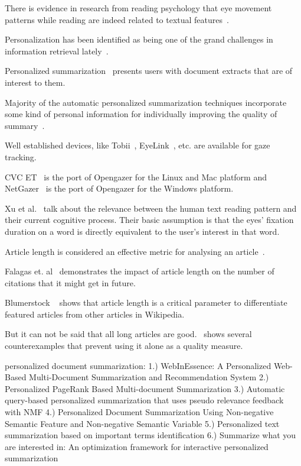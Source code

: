 \documentclass[12pt]{article}
\begin{document}
There is evidence in research from reading psychology that eye movement patterns while reading are indeed related to textual features~\cite{rayner1978eye}.


Personalization has been identified as being one of the grand challenges in information retrieval lately~\cite{belkin2008some}. 

Personalized summarization~\cite{berkovsky2008aspect} presents users with document extracts that are of interest to them. 

Majority of the automatic personalized summarization techniques incorporate some kind of personal information for individually improving the quality of summary~\cite{moro2012personalized, wu2008personalized, kumar2008generating}.

Well established devices, like Tobii~\cite{olsen2012tobii}, EyeLink~\cite{cornelissen2002eyelink}, etc. are available for gaze tracking.

CVC ET~\cite{ferhat2014cheap, CVC} is the port of Opengazer for the Linux and Mac platform and NetGazer~\cite{WinNT} is the port of Opengazer for the Windows platform.

Xu et al.~\cite{xu2009user} talk about the relevance between the human text reading pattern and their current cognitive process. Their basic assumption is that the eyes' fixation duration on a word is directly equivalent to the user's interest in that word.


Article length is considered an effective metric for analysing an article~\cite{chevalier2010wikipediaviz, dang2016quality}.   

Falagas et. al~\cite{falagas2013impact} demonstrates the impact of article length on the number of citations that it might get in future. 

Blumerstock ~\cite{blumenstock2008size} shows that article length is a critical parameter  to differentiate featured articles from other articles in Wikipedia. 


But it can not be said that all long articles are good.~\cite{blumenstock2008size} shows several counterexamples that prevent using it alone as a quality measure.



personalized document summarization:
1.) WebInEssence: A Personalized Web-Based Multi-Document
Summarization and Recommendation System
2.) Personalized PageRank Based Multi-document Summarization
3.) Automatic query-based personalized summarization that uses pseudo relevance feedback with NMF
4.) Personalized Document Summarization Using Non-negative Semantic Feature and Non-negative Semantic Variable
5.) Personalized text summarization based on important terms identification
6.) Summarize what you are interested in: An optimization framework for interactive personalized summarization


 

\end{document}
